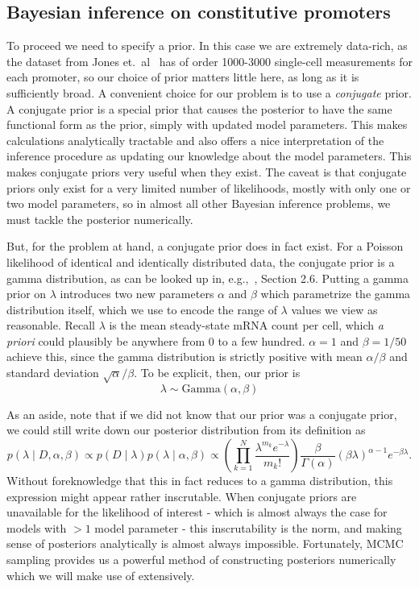 \subsection{Bayesian inference on constitutive promoters}
\label{sec:si_bayes_unreg}

To proceed we need to specify a prior. In this case we are extremely data-rich,
as the dataset from Jones et.\ al~\cite{Jones2014} has of order 1000-3000
single-cell measurements for each promoter, so our choice of prior matters
little here, as long as it is sufficiently broad. A convenient choice for our
problem is to use a \textit{conjugate} prior. A conjugate prior is a special
prior that causes the posterior to have the same functional form as the prior,
simply with updated model parameters. This makes calculations analytically
tractable and also offers a nice interpretation of the inference procedure as
updating our knowledge about the model parameters. This makes conjugate priors
very useful when they exist. The caveat is that conjugate priors only exist for
a very limited number of likelihoods, mostly with only one or two model
parameters, so in almost all other Bayesian inference problems, we must tackle
the posterior numerically.

But, for the problem at hand, a conjugate prior does in fact exist. For a
Poisson likelihood of identical and identically distributed data, the conjugate
prior is a gamma distribution, as can be looked up in, e.g.,~\cite{Gelman2013},
Section 2.6. Putting a gamma prior on $\lambda$ introduces two new parameters
$\alpha$ and $\beta$ which parametrize the gamma distribution itself, which we
use to encode the range of $\lambda$ values we view as reasonable. Recall
$\lambda$ is the mean steady-state mRNA count per cell, which \textit{a priori}
could plausibly be anywhere from 0 to a few hundred. $\alpha=1$ and $\beta=1/50$
achieve this, since the gamma distribution is strictly positive with mean
$\alpha/\beta$ and standard deviation $\sqrt{\alpha}/\beta$. To be explicit,
then, our prior is
\begin{equation}
\lambda \sim \text{Gamma}(\alpha, \beta)
\end{equation}

As an aside, note that if we did not know that our prior was a conjugate prior,
we could still write down our posterior distribution from its definition as
\begin{equation}
p(\lambda\mid D,\alpha,\beta)
\propto p(D\mid\lambda) p(\lambda \mid\alpha,\beta)
\propto \left(\prod_{k=1}^N \frac{\lambda^{m_k}e^{-\lambda}}{m_k!}\right)
        \frac{\beta}{\Gamma(\alpha)}(\beta\lambda)^{\alpha-1} e^{-\beta\lambda}
.
\end{equation}
Without foreknowledge that this in fact reduces to a gamma distribution, this
expression might appear rather inscrutable. When conjugate priors are
unavailable for the likelihood of interest - which is almost always the case for
models with $>1$ model parameter - this inscrutability is the norm, and making
sense of posteriors analytically is almost always impossible. Fortunately, MCMC
sampling provides us a powerful method of constructing posteriors numerically
which we will make use of extensively.

